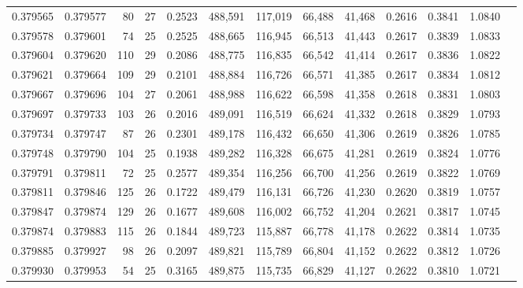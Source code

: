 \begin{tabular}{rrrrrrrrrrrrr}
0.379565 & 0.379577 &    80 &  27 &                                     0.2523 & 488,591 & 117,019 &  66,488 &  41,468 & 0.2616 & 0.3841 & 1.0840 \\
0.379578 & 0.379601 &    74 &  25 &                                     0.2525 & 488,665 & 116,945 &  66,513 &  41,443 & 0.2617 & 0.3839 & 1.0833 \\
0.379604 & 0.379620 &   110 &  29 &                                     0.2086 & 488,775 & 116,835 &  66,542 &  41,414 & 0.2617 & 0.3836 & 1.0822 \\
0.379621 & 0.379664 &   109 &  29 &                                     0.2101 & 488,884 & 116,726 &  66,571 &  41,385 & 0.2617 & 0.3834 & 1.0812 \\
0.379667 & 0.379696 &   104 &  27 &                                     0.2061 & 488,988 & 116,622 &  66,598 &  41,358 & 0.2618 & 0.3831 & 1.0803 \\
0.379697 & 0.379733 &   103 &  26 &                                     0.2016 & 489,091 & 116,519 &  66,624 &  41,332 & 0.2618 & 0.3829 & 1.0793 \\
0.379734 & 0.379747 &    87 &  26 &                                     0.2301 & 489,178 & 116,432 &  66,650 &  41,306 & 0.2619 & 0.3826 & 1.0785 \\
0.379748 & 0.379790 &   104 &  25 &                                     0.1938 & 489,282 & 116,328 &  66,675 &  41,281 & 0.2619 & 0.3824 & 1.0776 \\
0.379791 & 0.379811 &    72 &  25 &                                     0.2577 & 489,354 & 116,256 &  66,700 &  41,256 & 0.2619 & 0.3822 & 1.0769 \\
0.379811 & 0.379846 &   125 &  26 &                                     0.1722 & 489,479 & 116,131 &  66,726 &  41,230 & 0.2620 & 0.3819 & 1.0757 \\
0.379847 & 0.379874 &   129 &  26 &                                     0.1677 & 489,608 & 116,002 &  66,752 &  41,204 & 0.2621 & 0.3817 & 1.0745 \\
0.379874 & 0.379883 &   115 &  26 &                                     0.1844 & 489,723 & 115,887 &  66,778 &  41,178 & 0.2622 & 0.3814 & 1.0735 \\
0.379885 & 0.379927 &    98 &  26 &                                     0.2097 & 489,821 & 115,789 &  66,804 &  41,152 & 0.2622 & 0.3812 & 1.0726 \\
0.379930 & 0.379953 &    54 &  25 &                                     0.3165 & 489,875 & 115,735 &  66,829 &  41,127 & 0.2622 & 0.3810 & 1.0721 \\

\end{tabular}
